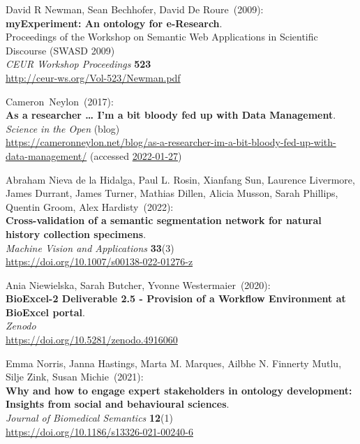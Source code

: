 \begin{thebibliography}{9}
David R Newman, Sean Bechhofer, David De Roure~(2009): \\
\textbf{myExperiment: An ontology for e-Research}.\\
Proceedings of the Workshop on Semantic Web Applications in Scientific Discourse (SWASD 2009)\\
\emph{CEUR Workshop Proceedings} \textbf{523}\\
\url{http://ceur-ws.org/Vol-523/Newman.pdf}

Cameron~Neylon~(2017): \\
\textbf{As a researcher \ldots{} I'm a bit bloody fed up with Data Management}.\\
\emph{Science in the Open} (blog)\\
\url{https://cameronneylon.net/blog/as-a-researcher-im-a-bit-bloody-fed-up-with-data-management/}
(accessed \href{https://web.archive.org/web/20220127113116/https://cameronneylon.net/blog/as-a-researcher-im-a-bit-bloody-fed-up-with-data-management/}{2022-01-27})

Abraham Nieva de la Hidalga, Paul L. Rosin, Xianfang Sun, Laurence Livermore, James Durrant, James Turner, Mathias Dillen, Alicia Musson, Sarah Phillips, Quentin Groom, Alex Hardisty~(2022): \\
\textbf{Cross-validation of a semantic segmentation network for natural history collection specimens}.\\
\emph{Machine Vision and Applications} \textbf{33}(3)\\
\url{https://doi.org/10.1007/s00138-022-01276-z}

Ania Niewielska, Sarah Butcher, Yvonne Westermaier~(2020): \\
\textbf{BioExcel-2 Deliverable 2.5 - Provision of a Workflow Environment at BioExcel portal}.\\
\emph{Zenodo}\\
\url{https://doi.org/10.5281/zenodo.4916060}

Emma Norris, Janna Hastings, Marta M. Marques, Ailbhe N. Finnerty Mutlu, Silje Zink, Susan Michie~(2021): \\
\textbf{Why and how to engage expert stakeholders in ontology development: Insights from social and behavioural sciences}. \\
\emph{Journal of Biomedical Semantics} \textbf{12}(1) \\
\url{https://doi.org/10.1186/s13326-021-00240-6}


\end{thebibliography}
